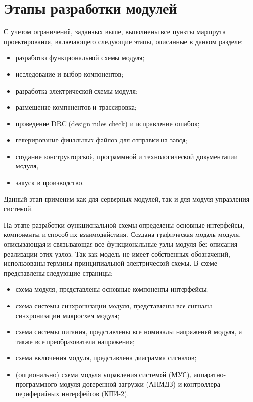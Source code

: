 \section{Этапы разработки модулей}

С учетом ограничений, заданных выше, выполнены все пункты маршрута проектирования, включающего следующие этапы, описанные в данном разделе:

\begin{itemize}
	\item разработка функциональной схемы модуля;
	\item исследование и выбор компонентов;
	\item разработка электрической схемы модуля;
	\item размещение компонентов и трассировка;
	\item проведение DRC (design rules check) и исправление ошибок;
	\item генерирование финальных файлов для отправки на завод;
	\item создание конструкторской, программной и технологической документации модуля;
	\item запуск в производство.
\end{itemize}

Данный этап применим как для серверных модулей, так и для модуля управления системой.

На этапе разработки функциональной схемы определены основные интерфейсы, компоненты и способ их взаимодействия. Создана графическая модель модуля, описывающая и связывающая все функциональные узлы модуля без описания реализации этих узлов. Так как модель не имеет собственных обозначений, использованы термины принципиальной электрической схемы. В схеме представлены следующие страницы:

\begin{itemize}
	\item схема модуля, представлены основные компоненты интерфейсы;
	\item схема системы синхронизации модуля, представлены все сигналы синхронизации микросхем модуля;
	\item схема системы питания, представлены все номиналы напряжений модуля, а также все преобразователи напряжения;
	\item схема включения модуля, представлена диаграмма сигналов;
	\item (опционально) схема модуля управления системой (МУС), аппаратно-программного модуля доверенной загрузки (АПМДЗ) и контроллера периферийных интерфейсов (КПИ-2).
\end{itemize}

